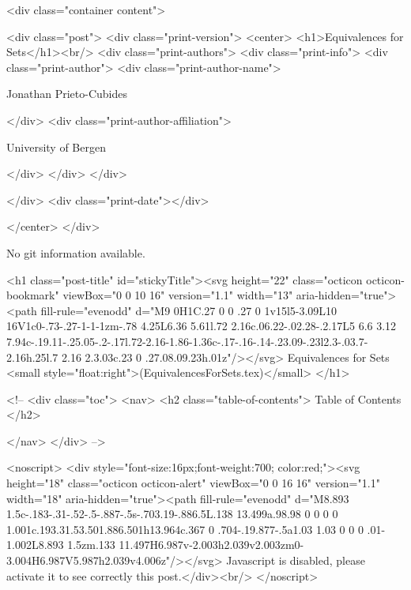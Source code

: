       <div class="container content">
        







<div class="post">
  <div class="print-version">
    <center>
      <h1>Equivalences for Sets</h1><br/>
        <div class="print-authors">
          <div class="print-info">
            <div class="print-author">
              <div class="print-author-name">
                
                  Jonathan Prieto-Cubides
                
              </div>
              <div class="print-author-affiliation">
                
                  University of Bergen
                
                </div>
            </div>
          </div>
          
          
        </div>
        <div class="print-date"></div>
        
        
    </center>
  </div>

  
  No git information available.
  

  <h1 class="post-title" id="stickyTitle"><svg height="22" class="octicon octicon-bookmark" viewBox="0 0 10 16" version="1.1" width="13" aria-hidden="true"><path fill-rule="evenodd" d="M9 0H1C.27 0 0 .27 0 1v15l5-3.09L10 16V1c0-.73-.27-1-1-1zm-.78 4.25L6.36 5.61l.72 2.16c.06.22-.02.28-.2.17L5 6.6 3.12 7.94c-.19.11-.25.05-.2-.17l.72-2.16-1.86-1.36c-.17-.16-.14-.23.09-.23l2.3-.03.7-2.16h.25l.7 2.16 2.3.03c.23 0 .27.08.09.23h.01z"/></svg> Equivalences for Sets <small style="float:right">(EquivalencesForSets.tex)</small>
  </h1>

  <!-- 
  <div class="toc">
    <nav>
    <h2 class="table-of-contents"> Table of Contents </h2>
      

    </nav>
  </div>
   -->

  <noscript>
  <div style="font-size:16px;font-weight:700; color:red;"><svg height="18" class="octicon octicon-alert" viewBox="0 0 16 16" version="1.1" width="18" aria-hidden="true"><path fill-rule="evenodd" d="M8.893 1.5c-.183-.31-.52-.5-.887-.5s-.703.19-.886.5L.138 13.499a.98.98 0 0 0 0 1.001c.193.31.53.501.886.501h13.964c.367 0 .704-.19.877-.5a1.03 1.03 0 0 0 .01-1.002L8.893 1.5zm.133 11.497H6.987v-2.003h2.039v2.003zm0-3.004H6.987V5.987h2.039v4.006z"/></svg> Javascript is disabled, please activate it to see correctly this post.</div><br/>
  </noscript>

